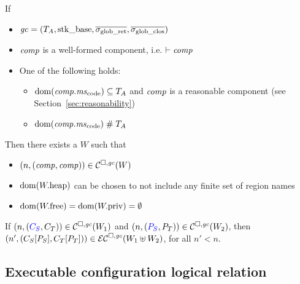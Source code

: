 \documentclass[acmsmall,review,anonymous]{acmart}\settopmatter{printfolios=true,printccs=false,printacmref=false}
\renewcommand{\comp}{\var{comp}}
\newcommand{\wdjud}[2][ ]{#1 \vdash #2}
\begin{document}
\begin{lemma}
  \label{lem:ftlr-comps}
  If
  \begin{itemize}
  \item $\gc = (\ta,\stkb,\gsigrets,\gsigcloss)$
  \item $\comp$ is a well-formed component, i.e. $\wdjud{\comp}$
  \item One of the following holds:
    \begin{itemize}
    \item $\dom(\comp.\mscode) \subseteq \ta$ and $\comp$ is a reasonable component (see Section~\ref{sec:reasonability})
    \item $\dom(\comp.\mscode) \mathrel{\#} \ta$
    \end{itemize}
  \end{itemize}
  Then there exists a $W$ such that
  \begin{itemize}
  \item $\npair{(\comp,\comp)} \in \lrcomp(W)$
  \item $\dom(\pwheap)$ can be chosen to not include any finite set of region names 
  \item $\dom(\pwfree) =
    \dom(\pwpriv)=\emptyset$
  \end{itemize}
\end{lemma}
\begin{lemma}
  \label{lem:compat-context-plug}
  If $\npair{\stpair{C}{C}}\in\lrcomp(W_1)$ and $\npair{\stpair{P}{P}} \in \lrcomp(W_2)$, then
  $\npair[n']{(\plug{C_S}{P_S},\plug{C_T}{P_T})} \in \lrec(W_1 \uplus W_2)$, for all $n' < n$.
\end{lemma}


\subsection{Executable configuration logical relation}
\end{document}
